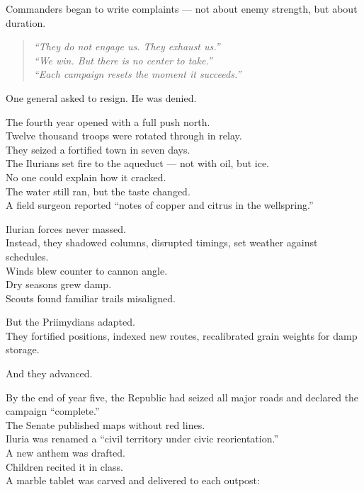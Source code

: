 \documentclass[12pt]{article}
\begin{document}
\vspace{1em}

Commanders began to write complaints — not about enemy strength, but about duration.

\begin{quote}
\textit{“They do not engage us. They exhaust us.”}\\
\textit{“We win. But there is no center to take.”}\\
\textit{“Each campaign resets the moment it succeeds.”}
\end{quote}

One general asked to resign. He was denied.

\vspace{1em}

The fourth year opened with a full push north.\\
Twelve thousand troops were rotated through in relay.\\
They seized a fortified town in seven days.\\
The Ilurians set fire to the aqueduct — not with oil, but ice.\\
No one could explain how it cracked.\\
The water still ran, but the taste changed.\\
A field surgeon reported “notes of copper and citrus in the wellspring.”

\vspace{1em}

Ilurian forces never massed.\\
Instead, they shadowed columns, disrupted timings, set weather against schedules.\\
Winds blew counter to cannon angle.\\
Dry seasons grew damp.\\
Scouts found familiar trails misaligned.

But the Priimydians adapted.\\
They fortified positions, indexed new routes, recalibrated grain weights for damp storage.

And they advanced.

\vspace{1em}

By the end of year five, the Republic had seized all major roads and declared the campaign “complete.”\\
The Senate published maps without red lines.\\
Iluria was renamed a “civil territory under civic reorientation.”\\
A new anthem was drafted.\\
Children recited it in class.\\
A marble tablet was carved and delivered to each outpost:
\end{document}
